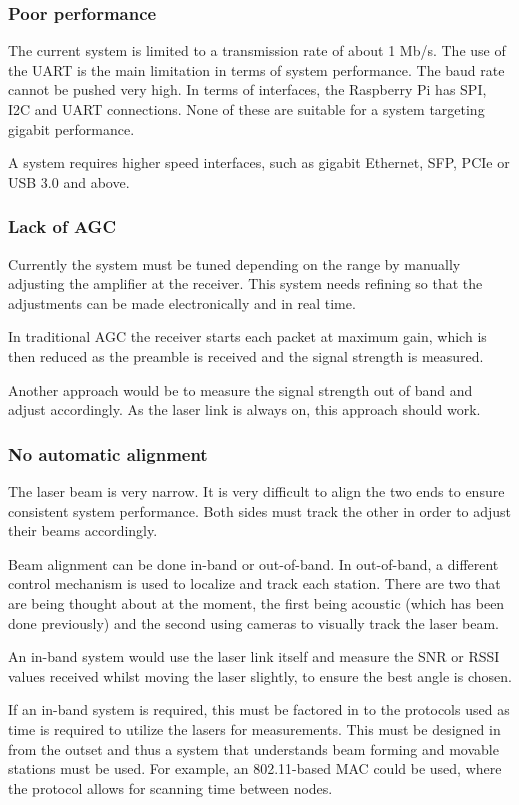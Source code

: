 \subsubsection{Poor performance}
The current system is limited to a transmission rate of about 1 Mb/s. The use
of the UART is the main limitation in terms of system performance. The baud
rate cannot be pushed very high. In terms of interfaces, the Raspberry Pi has
SPI, I2C and UART connections. None of these are suitable for a system
targeting gigabit performance.

A system requires higher speed interfaces, such as gigabit Ethernet,
\ac{SFP}, \ac{PCIe} or \ac{USB} 3.0 and above.

\subsubsection{Lack of \ac{AGC}}
Currently the system must be tuned depending on the range by manually
adjusting the amplifier at the receiver. This system needs refining so that
the adjustments can be made electronically and in real time.

In traditional \ac{AGC} the receiver starts each packet at maximum gain,
which is then reduced as the preamble is received and the signal strength
is measured.

Another approach would be to measure the signal strength out of band and
adjust accordingly. As the laser link is always on, this approach should work.

\subsubsection{No automatic alignment}
The laser beam is very narrow. It is very difficult to align the two ends
to ensure consistent system performance. Both sides must track the other in
order to adjust their beams accordingly.

Beam alignment can be done in-band or out-of-band. In out-of-band, a different
control mechanism is used to localize and track each station. There are two
that are being thought about at the moment, the first being acoustic (which
has been done previously) and the second using cameras to visually track the
laser beam.

An in-band system would use the laser link itself and measure the \ac{SNR} or
\ac{RSSI} values received whilst moving the laser slightly, to ensure the best
angle is chosen.

If an in-band system is required, this must be factored in to the protocols
used as time is required to utilize the lasers for measurements. This must
be designed in from the outset and thus a system that understands beam forming
and movable stations must be used. For example, an 802.11-based \ac{MAC} could
be used, where the protocol allows for scanning time between nodes.
